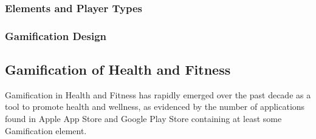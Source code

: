 
\subsubsection{Elements and Player Types}

\subsubsection{Gamification Design}

\subsection{Gamification of Health and Fitness}
Gamification in Health and Fitness has rapidly emerged over the past decade as a tool to promote health and wellness, as evidenced by the number of applications found in Apple App Store and Google Play Store containing at least some Gamification element. 

